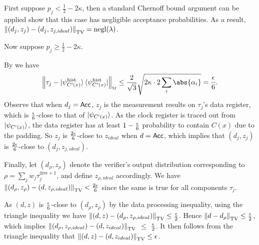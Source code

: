 \begin{prf} 
	First suppose $p_j<\frac{1}{2}-2\kappa$,
	then a standard Chernoff bound argument can be applied show that this case has negligible acceptance probabilities.
	As a result, $\left\lVert(d_j, z_j)-(d_j, z_{j, ideal})\right\rVert_{\mathrm{TV}}=\operatorname{negl}(\lambda)$.

	Now suppose $p_j\geq\frac{1}{2}-2\kappa$.
	\iffalse
	By \Cref{cor:HamCheck} we have a lower bound for the fidelity between $\tau_j$ and $\ket{\psi_{C'(x)}}$:
	$$p_j>\frac{1}{2}-2\kappa\Rightarrow F(\tau_j, \ket{\psi_{C'(x)}}\bra{\psi_{C'(x)}})\geq1-\frac{\eps^2}{36}.$$
	which in turn implies a lower bound on the respective trace distance:
	$$\norm{\tau_j - \ket{\psi_{C'(x)}}\bra{\psi_{C'(x)}}}_{\tr}<\frac{\eps}{6}.$$
	\fi
	By  we have
	$$\norm{\tau_j - \ket{\psi^{\mathrm{hist}}_{C'(x)}}\bra{\psi^{\mathrm{hist}}_{C'(x)}}}_{\tr}\leq\frac{2}{\sqrt{3}}\sqrt{2\kappa\cdot2\sum_i\abs{\alpha_i}}=\frac{\eps}{6}.$$
	Observe that when $d_j=\mathsf{Acc}$, $z_j$ is the measurement results on $\tau_j$'s data register,
	which is $\frac{\epsilon}{6}$-close to that of $\ket{\psi_{C'(x)}}$.
	As the clock register is traced out from $\ket{\psi_{C'(x)}}$, the data register has at least $1-\frac{\epsilon}{6}$ probability to contain $C(x)$ due to the padding.
	So $z_j$ is $\frac{2\epsilon}{6}$-close to $z_{ideal}$ when $d=\mathsf{Acc}$,
	which implies that $(d_j, z_j)$ is $\frac{2\epsilon}{6}$-close to $(d_j, z_{j, ideal})$.

    Finally, let $(d_\rho, z_\rho)$ denote the verifier's output distribution corresponding to $\rho=\sum_j w_j\tau_j^{\otimes m+1}$,
	and define $z_{\rho, ideal}$ accordingly.
	We have $\left\lVert(d_\rho, z_\rho) - (d, z_{\rho, ideal})\right\rVert_{\mathrm{TV}} < \frac{2\epsilon}{6}$ since the same is true for all components $\tau_j$.

	As $(d, z)$ is $\frac{\epsilon}{6}$-close to $(d_\rho, z_\rho)$ by the data processing inequality,
	using the triangle inequality we have $\left\lVert(d, z) - (d_\rho, z_{\rho, ideal})\right\rVert_{\mathrm{TV}}\leq\frac{\epsilon}{2}$.
	Hence $\left\lVert d - d_\rho\right\rVert_{\mathrm{TV}}\leq\frac{\epsilon}{2}$, which implies $\left\lVert(d_\rho, z_{\rho, ideal}) - (d, z_{ideal})\right\rVert_{\mathrm{TV}}$ $\leq$ $\frac{\epsilon}{2}$.
	It then follows from the triangle inequality that
	$\left\lVert(d, z) - (d, z_{ideal})\right\rVert_{\mathrm{TV}}\leq\epsilon$.
\end{prf}
